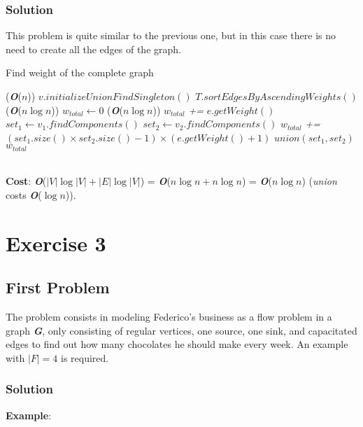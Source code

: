 \documentclass[11pt]{article}
\begin{document}
\subsubsection*{Solution}
This problem is quite similar to the previous one, but in this case there is no need to create all the edges of the graph.
\begin{algorithm}
	\caption{Find weight of the complete graph}\label{euclid}
	\begin{algorithmic}[1]
		 \qquad \qquad \qquad \qquad \qquad \qquad \qquad \qquad \qquad \qquad \qquad \qquad (\textbf{\textit{O}}($n$))
			\State $v.initializeUnionFindSingleton()$
		\EndFor
		\State $T.sortEdgesByAscendingWeights()$ \qquad \qquad \qquad \qquad \qquad \qquad \qquad (\textbf{\textit{O}}($n\log{n}$))
		\State $w_{total} \gets 0$
		 \qquad \qquad \qquad \qquad \qquad \qquad \qquad \qquad \qquad \qquad (\textbf{\textit{O}}($n \log{n}$))
			\State $w_{total}$ \textit{+=} $e.getWeight()$
			\State  $set_1 \gets v_1.findComponents()$
			\State  $set_2 \gets v_2.findComponents()$
			\State $w_{total}$ \textit{+=} $(set_1.size() \times set_2.size() - 1) \times (e.getWeight() + 1)$
			\State $union(set_1, set_2)$
		\EndFor
		\State \Return $w_{total}$
	\end{algorithmic}
\end{algorithm} \\
\textbf{Cost}: \textbf{\textit{O}}($|V|\log{|V|} + |E| \log{|V|}$) = \textbf{\textit{O}}($n\log{n} + n\log{n}$) = \textbf{\textit{O}}($n\log{n}$) (\textit{union} costs \textbf{\textit{O}}($\log{n}$)).
\newpage

\section*{Exercise 3}
\subsection*{First Problem}
The problem consists in modeling Federico's business as a flow problem in a graph \textbf{\textit{G}}, only consisting of regular vertices, one source, one sink, and capacitated edges to find out how many chocolates he should make every week. An example with $|F| = 4$ is required.
\subsubsection*{Solution}
\textbf{Example}:
\end{document}
